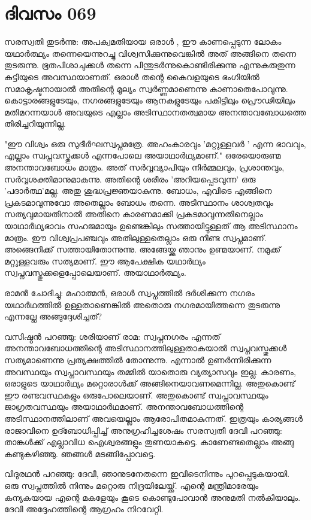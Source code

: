  
\section{ദിവസം 069}


സരസ്വതി തുടര്‍ന്നു: അപക്വമതിയായ ഒരാള്‍ , ഈ കാണപ്പെടുന്ന ലോകം യഥാര്‍ത്ഥ്യം തന്നെയെന്നുറച്ചു വിശ്വസിക്കുന്നുവെങ്കില്‍ അത്‌ അങ്ങിനെ തന്നെ തുടരുന്നു. ഭൂതപിശാചുക്കൾ തന്നെ പിന്തുടര്‍ന്നുകൊണ്ടിരിക്കുന്നു എന്നുകരുതുന്ന കുട്ടിയുടെ അവസ്ഥയാണത്‌. ഒരാള്‍ തന്റെ കൈവളയുടെ ഭംഗിയില്‍ സമാകൃഷ്ടനായാല്‍ അതിന്റെ മൂല്യം സ്വര്‍ണ്ണമാണെന്നു കാണാതെപോവുന്നു. കൊട്ടാരങ്ങളുടേയും, നഗരങ്ങളുടേയും ആനകളുടേയും പകിട്ടിലും പ്രൌഢിയിലും മതിമറന്നയാള്‍ അവയുടെ എല്ലാം അടിസ്ഥാനതത്വമായ അനന്താവബോധത്തെ തിരിച്ചറിയുന്നില്ല.

"ഈ വിശ്വം ഒരു സുദീര്‍ഘസ്വപ്നമത്രേ. അഹംകാരവും 'മറ്റുള്ളവര്‍ ' എന്ന ഭാവവും, എല്ലാം സ്വപ്നവസ്തുക്കള്‍ എന്നപോലെ അയാഥാര്‍ഥ്യമാണ്‌." ഒരേയൊരുണ്മ അനന്താവബോധം മാത്രം. അത്‌ സര്‍വ്വവ്യാപിയും നിര്‍മ്മലവും, പ്രശാന്തവും, സര്‍വ്വശക്തിമാനുമാകുന്നു. അതിന്റെ ശരീരം 'അറിയപ്പെടവുന്ന' ഒരു 'പദാര്‍ത്ഥ'മല്ല. അതു ശുദ്ധപ്രജ്ഞയാകുന്നു. ബോധം, എവിടെ എങ്ങിനെ  പ്രകടമാവുന്നുവോ അതെല്ലാം ബോധം തന്നെ. അടിസ്ഥാനം ശാശ്വതവും സത്യവുമായതിനാല്‍ അതിനെ കാരണമാക്കി പ്രകടമാവുന്നതിനെല്ലാം യാഥാര്‍ഥ്യഭാവം സഹജമായും ഉണ്ടെങ്കിലും സത്തായിട്ടുള്ളത്‌ ആ അടിസ്ഥാനം മാത്രം. ഈ വിശ്വപ്രപഞ്ചവും അതിലുള്ളതെല്ലാം ഒരു നീണ്ട സ്വപ്നമാണ്‌. അങ്ങെനിക്ക്‌ സത്തായിതോന്നുന്നു. അങ്ങേയ്ക്കു ഞാനും ഉണ്മയാണ്‌. നമുക്ക്‌ മറ്റുള്ളവരും സത്യമാണ്‌. ഈ ആപേക്ഷിക യഥാര്‍ഥ്യം സ്വപ്നവസ്തുക്കളെപ്പോലെയാണ്‌. അയാഥാർത്ഥ്യം.

രാമന്‍ ചോദിച്ചു: മഹാത്മന്‍, ഒരാള്‍ സ്വപ്നത്തില്‍ ദര്‍ശിക്കുന്ന നഗരം യഥാര്‍ഥത്തില്‍ ഉള്ളതാണെങ്കില്‍ അതൊരു നഗരമായിത്തന്നെ തുടരുന്നു എന്നല്ലേ അങ്ങുദ്ദേശിച്ചത്‌?

വസിഷ്ഠന്‍ പറഞ്ഞു: ശരിയാണ്‌ രാമ: സ്വപ്നനഗരം എന്നത്‌ അനന്താവബോധത്തിന്റെ അടിസ്ഥാനത്തിലുള്ളതാകയാല്‍ സ്വപ്നവസ്തുക്കള്‍ സത്യമാണെന്നു പ്രത്യക്ഷത്തില്‍ തോന്നുന്നു. എന്നാല്‍ ഉണര്‍ന്നിരിക്കുന്ന അവസ്ഥയും സ്വപ്നാവസ്ഥയും തമ്മില്‍ യാതൊരു വ്യത്യാസവും ഇല്ല. കാരണം, ഒരാളുടെ യാഥാര്‍ഥ്യം മറ്റൊരാള്‍ക്ക്‌ അങ്ങിനെയാവണമെന്നില്ല. അതുകൊണ്ട്‌ ഈ രണ്ടവസ്ഥകളും ഒരുപോലെയാണ്‌. അതുകൊണ്ട്‌ സ്വപ്നാവസ്ഥയും ജാഗ്രതവസ്ഥയും അയാഥാര്‍ഥമാണ്‌. അനന്താവബോധത്തിന്റെ  അടിസ്ഥാനത്തിലാണ്‌ അവയെല്ലാം ആരോപിതമാകുന്നത്‌. ഇത്രയും കാര്യങ്ങള്‍ രാജാവിനെ ഉദ്ബോധിപ്പിച്ച്‌ അനുഗ്രഹിച്ചശേഷം സരസ്വതീ ദേവി പറഞ്ഞു: താങ്കള്‍ക്ക്‌ എല്ലാവിധ ഐശ്വരങ്ങളും തുണയാകട്ടെ. കാണേണ്ടതെല്ലാം അങ്ങു കണ്ടുകഴിഞ്ഞു. ഞങ്ങൾ മടങ്ങിപ്പോവട്ടെ.

വിദുരഥന്‍ പറഞ്ഞു: ദേവീ, ഞാനുടനേതന്നെ ഇവിടെനിന്നും പുറപ്പെടുകയായി. ഒരു സ്വപ്നത്തില്‍ നിന്നും മറ്റൊരു നിദ്രയിലേയ്ക്ക്‌. എന്റെ മന്ത്രിമാരേയും കന്യകയായ എന്റെ മകളേയും കൂടെ കൊണ്ടുപോവാന്‍ അനുമതി നല്‍കിയാലും. ദേവി അദ്ദേഹത്തിന്റെ ആഗ്രഹം നിറവേറ്റി.
